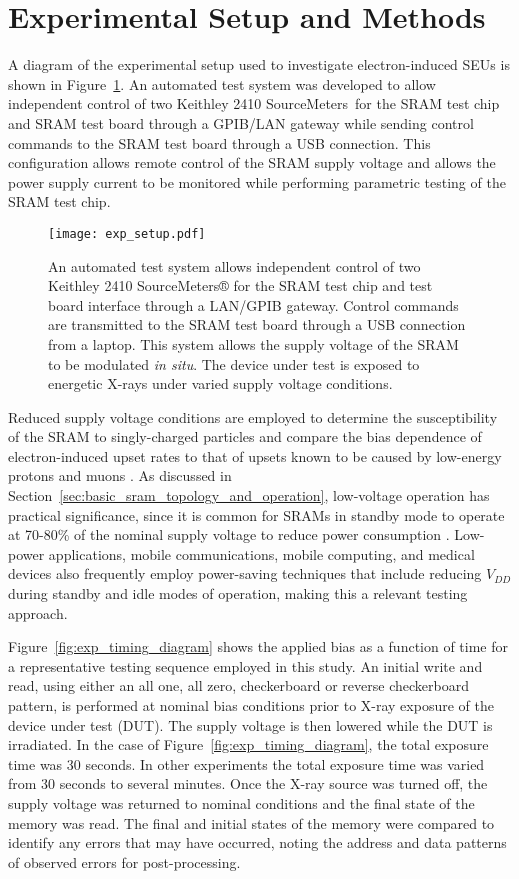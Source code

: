 \section{Experimental Setup and Methods} %
\label{sec:experimental_setup_and_methods}
A diagram of the experimental setup used to investigate electron-induced SEUs is shown in Figure~\ref{fig:exp_diagram}. 
An automated test system was developed to allow independent control of two Keithley 2410 SourceMeters\textregistered~for the SRAM test chip and SRAM test board through a GPIB/LAN gateway while sending control commands to the SRAM test board through a USB connection. 
This configuration allows remote control of the SRAM supply voltage and allows the power supply current to be monitored while performing parametric testing of the SRAM test chip.
\begin{figure}[htbp]
    \centering
        \texttt{[image: exp\_setup.pdf]}
        \caption{An automated test system allows independent control of two Keithley 2410 SourceMeters® for the SRAM test chip and test board interface through a LAN/GPIB gateway. Control commands are transmitted to the SRAM test board through a USB connection from a laptop. This system allows the supply voltage of the SRAM to be modulated \emph{in situ}. The device under test is exposed to energetic X-rays under varied supply voltage conditions.}
        \label{fig:exp_diagram}
\end{figure}

Reduced supply voltage conditions are employed to determine the susceptibility of the SRAM to singly-charged particles and compare the bias dependence of electron-induced upset rates to that of upsets known to be caused by low-energy protons and muons \cite{Rodbell:2007vl, Sierawski:2010cj}.
As discussed in Section~\ref{sec:basic_sram_topology_and_operation}, low-voltage operation has practical significance, since it is common for SRAMs in standby mode to operate at 70-80\% of the nominal supply voltage to reduce power consumption \cite{semeraro:2002dvfs,david:2011dvfs}.
Low-power applications, mobile communications, mobile computing, and medical devices also frequently employ power-saving techniques that include reducing $V_{DD}$ during standby and idle modes of operation, making this a relevant testing approach.

Figure~\ref{fig:exp_timing_diagram} shows the applied bias as a function of time for a representative testing sequence employed in this study. 
An initial write and read, using either an all one, all zero, checkerboard or reverse checkerboard pattern, is performed at nominal bias conditions prior to X-ray exposure of the device under test (DUT). 
The supply voltage is then lowered while the DUT is irradiated. In the case of Figure~\ref{fig:exp_timing_diagram}, the total exposure time was 30 seconds. 
In other experiments the total exposure time was varied from 30 seconds to several minutes. 
Once the X-ray source was turned off, the supply voltage was returned to nominal conditions and the final state of the memory was read. 
The final and initial states of the memory were compared to identify any errors that may have occurred, noting the address and data patterns of observed errors for post-processing.

